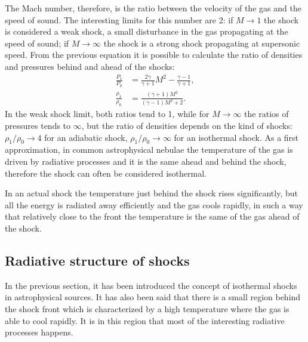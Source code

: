 \documentclass[../main.tex]{subfiles}
\begin{document}
The Mach number, therefore, is the ratio between the velocity of the gas and the speed of sound.
The interesting limits for this number are 2: if $M\to 1$ the shock is considered a weak shock, a small disturbance in the gas propagating at the speed of sound; if $M\to\infty$ the shock is a strong shock propagating at supersonic speed.
From the previous equation it is possible to calculate the ratio of densities and pressures behind and ahead of the shocks:
\begin{align}
    \label{eq:ratios1}
    \frac{P_1}{P_0} & = \frac{2\gamma}{\gamma+1}M^2 -\frac{\gamma-1}{\gamma+1},\\
    \label{eq:ratios2}
    \frac{\rho_1}{\rho_0} & = \frac{(\gamma+1)M^2}{(\gamma-1)M^2+2}.
\end{align}
In the weak shock limit, both ratios tend to 1, while for $M\to\infty$ the ratios of pressures tends to $\infty$, but the ratio of densities depends on the kind of shocks: $\rho_1/\rho_0 \to 4$ for an adiabatic shock, $\rho_1/\rho_0 \to \infty$ for an isothermal shock.
As a first approximation, in common astrophysical nebulae the temperature of the gas is driven by radiative processes and it is the same ahead and behind the shock, therefore the shock can often be considered isothermal.

In an actual shock the temperature just behind the shock rises significantly, but all the energy is radiated away efficiently and the gas cools rapidly, in such a way that relatively close to the front the temperature is the same of the gas ahead of the shock.

\subsection{Radiative structure of shocks}

In the previous section, it has been introduced the concept of isothermal shocks in astrophysical sources.
It has also been said that there is a small region behind the shock front which is characterized by a high temperature where the gas is able to cool rapidly.
It is in this region that most of the interesting radiative processes happens.
\end{document}
